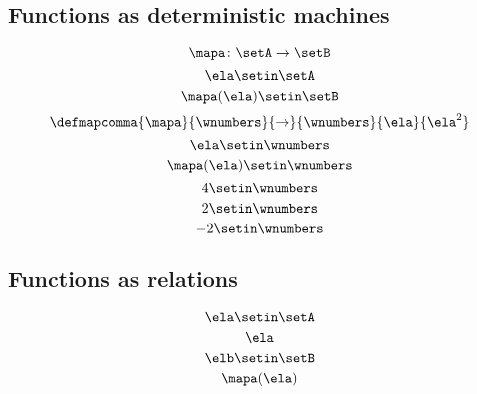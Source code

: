\begin{forslides}
\subsection{Functions as deterministic machines}

%
\begin{equation}\label{eq:slides_session2_94}
\mapa\colon \setA \to \setB
\end{equation}
\begin{equation}\label{eq:slides_session2_95}
\ela \setin\setA
\end{equation}
\begin{equation}\label{eq:slides_session2_96}
\mapa(\ela) \setin\setB
\end{equation}
\begin{equation}\label{eq:slides_session2_97}
\defmapcomma{\mapa}{\wnumbers}{\to}{\wnumbers}{\ela}{\ela^2}
\end{equation}
\begin{equation}\label{eq:slides_session2_98}
\ela \setin\wnumbers
\end{equation}
\begin{equation}\label{eq:slides_session2_99}
\mapa(\ela) \setin\wnumbers
\end{equation}
\begin{equation}\label{eq:slides_session2_100}
4 \setin\wnumbers
\end{equation}
\begin{equation}\label{eq:slides_session2_101}
2 \setin\wnumbers
\end{equation}
\begin{equation}\label{eq:slides_session2_102}
-2 \setin\wnumbers
\end{equation}

\subsection{Functions as relations}

\begin{equation}\label{eq:slides_session2_103}
\ela \setin\setA
\end{equation}
\begin{equation}\label{eq:slides_session2_104}
\ela
\end{equation}
\begin{equation}\label{eq:slides_session2_105}
\elb \setin \setB
\end{equation}
\begin{equation}\label{eq:slides_session2_106}
\mapa(\ela)
\end{equation}


\end{forslides}
